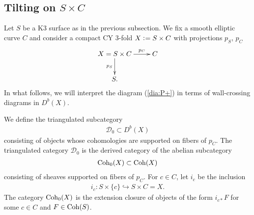 \documentclass[11pt]{amsart}
\theoremstyle{plain}
\newcommand{\dD}{\mathcal{D}}
\newcommand{\Coh}{\mathop{\rm Coh}\nolimits}
\begin{document}
\subsection{Tilting on $S \times C$}
Let $S$ be a K3 surface as in the previous subsection. 
We fix a smooth elliptic curve $C$ and consider 
a compact CY 3-fold $X\cneq S \times C$
with projections $p_S$, $p_C$ 
\begin{align*}
\xymatrix{
X = S \times C \ar[d]_-{p_S} \ar[r]^-{p_C} & C \\
S.
}
\end{align*}
In what follows, we will 
interpret the diagram (\ref{dia:P+}) in terms of wall-crossing 
diagrams in 
$D^b(X)$. 

We define the triangulated subcategory
\begin{align*}
\dD_0 \subset D^b(X)
\end{align*}
consisting of objects 
whose cohomologies are 
supported on fibers of $p_C$. 
The triangulated category $\dD_0$ is the 
derived category of the abelian subcategory
\begin{align*}
\Coh_0(X) \subset \Coh(X)
\end{align*}
consisting of sheaves supported on fibers of $p_C$.
For $c \in C$, let $i_c$ be the inclusion 
\begin{align}\label{ic:include}
i_{c} \colon S \times \{c\} \hookrightarrow S \times C
=X. 
\end{align}
The category $\Coh_0(X)$ is the extension closure of objects 
of the form $i_{c\ast}F$ for some $c \in C$
and 
$F \in \Coh(S)$. 
\end{document}
